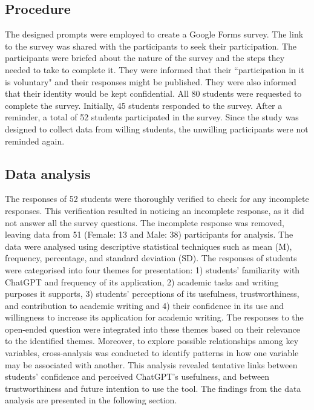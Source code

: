 \documentclass[english]{textolivre}
\begin{document}
\subsection{Procedure}
The designed prompts were employed to create a Google Forms survey. The link to the survey was shared with the participants to seek their participation. The participants were briefed about the nature of the survey and the steps they needed to take to complete it. They were informed that their ``participation in it is voluntary" and their responses might be published. They were also informed that their identity would be kept confidential. All 80 students were requested to complete the survey. Initially, 45 students responded to the survey. After a reminder, a total of 52 students participated in the survey. Since the study was designed to collect data from willing students, the unwilling participants were not reminded again.

\subsection{Data analysis}
The responses of 52 students were thoroughly verified to check for any incomplete responses. This verification resulted in noticing an incomplete response, as it did not answer all the survey questions. The incomplete response was removed, leaving data from 51 (Female: 13 and Male: 38) participants for analysis. The data were analysed using descriptive statistical techniques such as mean (M), frequency, percentage, and standard deviation (SD). The responses of students were categorised into four themes for presentation: 1) students’ familiarity with ChatGPT and frequency of its application, 2) academic tasks and writing purposes it supports, 3) students’ perceptions of its usefulness, trustworthiness, and contribution to academic writing and 4) their confidence in its use and willingness to increase its application for academic writing. The responses to the open-ended question were integrated into these themes based on their relevance to the identified themes. Moreover, to explore possible relationships among key variables, cross-analysis was conducted to identify patterns in how one variable may be associated with another. This analysis revealed tentative links between students’ confidence and perceived ChatGPT’s usefulness, and between trustworthiness and future intention to use the tool. The findings from the data analysis are presented in the following section.
\end{document}
